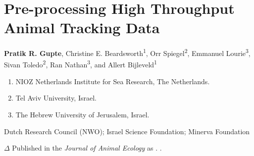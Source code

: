\chapter{Pre-processing High Throughput Animal Tracking Data}\label{ch:preprocessing}
% 
{\noindent \textbf{Pratik R. Gupte}, Christine E. Beardsworth\textsuperscript{1}, Orr Spiegel\textsuperscript{2}, Emmanuel Lourie\textsuperscript{3}, Sivan Toledo\textsuperscript{2}, Ran Nathan\textsuperscript{3}, and Allert Bijleveld\textsuperscript{1}}

    \medskip

    {\normalsize{}}

    \begin{enumerate}
        \item NIOZ Netherlands Institute for Sea Research, The Netherlands.
        \item Tel Aviv University, Israel.
        \item The Hebrew University of Jerusalem, Israel.
    \end{enumerate}

    \medskip

    {\normalsize{}}

    Dutch Research Council (NWO); Israel Science Foundation; Minerva Foundation

    \bigskip

    {\noindent \large{$\Delta$}} \normalfont Published in the \textit{Journal of Animal Ecology} as \citet{gupte2022d}. .

\clearpage
